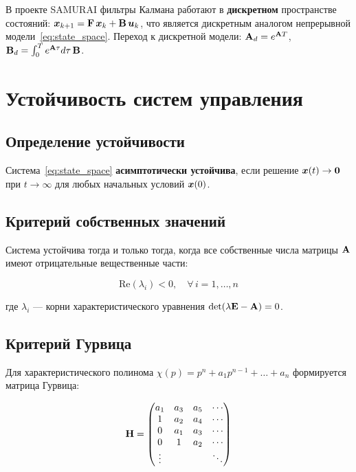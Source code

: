 \begin{notebox}
В проекте SAMURAI фильтры Калмана работают в \textbf{дискретном}
пространстве состояний:
$\bm{x}_{k+1} = \mathbf{F}\,\bm{x}_k + \mathbf{B}\,\bm{u}_k$,
что является дискретным аналогом непрерывной модели~\eqref{eq:state_space}.
Переход к дискретной модели:
$\mathbf{A}_d = e^{\mathbf{A}T}$, $\mathbf{B}_d = \int_0^T e^{\mathbf{A}\tau}d\tau\,\mathbf{B}$.
\end{notebox}

\section{Устойчивость систем управления}
\label{sec:stability}

\subsection{Определение устойчивости}

Система~\eqref{eq:state_space} \textbf{асимптотически устойчива},
если решение $\bm{x}(t) \to \bm{0}$ при $t \to \infty$
для любых начальных условий $\bm{x}(0)$.

\subsection{Критерий собственных значений}

Система устойчива тогда и только тогда, когда все собственные числа
матрицы $\mathbf{A}$ имеют отрицательные вещественные части:

\begin{equation}
  \boxed{\mathrm{Re}(\lambda_i) < 0, \quad \forall\, i = 1, \ldots, n}
  \label{eq:stability_eigenvalues}
\end{equation}

где $\lambda_i$ --- корни характеристического уравнения $\det(\lambda\mathbf{E} - \mathbf{A}) = 0$.

\subsection{Критерий Гурвица}

Для характеристического полинома $\chi(p) = p^n + a_1 p^{n-1} + \ldots + a_n$
формируется матрица Гурвица:

\begin{equation}
  \mathbf{H} = \begin{pmatrix}
    a_1 & a_3 & a_5 & \cdots\\
    1   & a_2 & a_4 & \cdots\\
    0   & a_1 & a_3 & \cdots\\
    0   & 1   & a_2 & \cdots\\
    \vdots & & & \ddots
  \end{pmatrix}
  \label{eq:hurwitz}
\end{equation}

